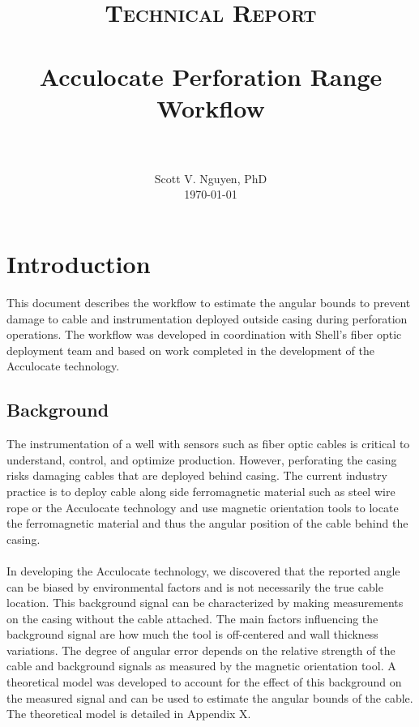 \documentclass[paper=a4, fontsize=11pt]{scrartcl}
\title{
		\usefont{OT1}{bch}{b}{n}
		\normalfont \normalsize \textsc{Technical Report} \\ [25pt]
		\horrule{0.5pt} \\[0.4cm]
		\huge Acculocate Perforation Range Workflow \\
		\horrule{2pt} \\[0.5cm]
}
\author{
		\normalfont 								\normalsize
        Scott V. Nguyen, PhD\\[-3pt]		\normalsize
        \today
}
\date{}
\numberwithin{equation}{section}		%
\numberwithin{figure}{section}			%
\numberwithin{table}{section}				%
\begin{document}
\maketitle
\section{Introduction}
This document describes the workflow to estimate the angular bounds to prevent damage to cable and instrumentation deployed outside casing during perforation operations.  The workflow was developed in coordination with Shell's fiber optic deployment team and based on work completed in the development of the Acculocate technology.  

\subsection{Background}
The instrumentation of a well with sensors such as fiber optic cables is critical to understand, control, and optimize production.  However, perforating the casing risks damaging cables that are deployed behind casing.  The current industry practice is to deploy cable along side ferromagnetic material such as steel wire rope or the Acculocate technology and use magnetic orientation tools to locate the ferromagnetic material and thus the angular position of the cable behind the casing.  

\paragraph{}
In developing the Acculocate technology, we discovered that the reported angle can be biased by environmental factors and is not necessarily the true cable location.  This background signal can be characterized by making measurements on the casing without the cable attached.  The main factors influencing the background signal are how much the tool is off-centered and wall thickness variations.  The degree of angular error depends on the relative strength of the cable and background signals as measured by the magnetic orientation tool.  A theoretical model was developed to account for the effect of this background on the measured signal and can be used to estimate the angular bounds of the cable.  The theoretical model is detailed in Appendix X.
\end{document}
